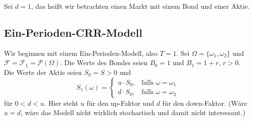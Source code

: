 \documentclass[a4paper,twoside,DIV15,BCOR12mm]{scrbook}
\newcommand{\cF}{\mathcal F}
\begin{document}
Sei $d=1$, das heißt wir betrachten einen Markt mit einem Bond und einer Aktie.

\subsection{Ein-Perioden-CRR-Modell}

Wir beginnen mit einem Ein-Perioden-Modell, also $T=1$. Sei $\Omega=\{\omega_1,\omega_2\}$ und $\cF = \cF_1 = \mathcal P(\Omega)$. Die Werte des Bondes seien $B_0=1$ und $B_1= 1 + r$, $r>0$. Die Werte der Aktie seien $S_0=S>0$ und 
\[
S_1(\omega) = 
\begin{cases}
u\cdot S_0,& \text{falls } \omega = \omega_1\\
d\cdot S_0,& \text{falls } \omega = \omega_2
\end{cases}
\]
für $0 < d < u$. Hier steht $u$ für den up-Faktor und $d$ für den down-Faktor. (Wäre $u=d$, wäre das Modell nicht wirklich stochastisch und damit nicht interessant.)
\end{document}
